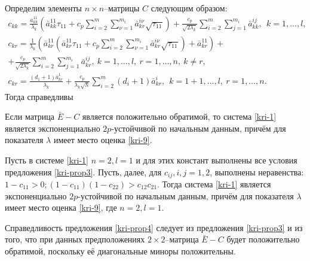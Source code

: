 Определим элементы $n\times n$--матрицы $C$ следующим образом:
$$
\begin{array}{crl}
c_{kk}  = \frac{\bar a^{11}_{kk}}{\lambda _k }\left(\bar
a^{11}_{kk}\tau _{11}  + c_p\sum \limits_{i=2}^m \sum
\limits_{\nu=1}^{m_i}\bar a^{i\nu}_{kr}\sqrt{\tau _{11}}\right) +
\frac{c_p}{\sqrt{2\lambda_k }}\sum
\limits_{i=2}^m \sum \limits_{j=1}^{m_i}\bar a^{ij}_{kk}, \ \ k = 1,\dots,l,\\
c_{kr} = \frac{1}{\lambda _k }\left(\bar a^{11}_{kr}\left(\bar
a^{11}_{kr} \tau _{11} + c_p\sum \limits_{i=2}^m \sum
\limits_{\nu=1}^{m_i}\bar a^{i\nu}_{kr}\sqrt{\tau _{11}}\right)
+ \bar a^{11}_{kr}\right)+
\\ +
\frac{c_p}{\sqrt{2\lambda_k }}\sum
\limits_{i=2}^m \sum \limits_{j=1}^{m_i}\bar a^{ij}_{kr}, \ k =
1,\dots,l,\ r = 1,\dots, n, \ k \neq r,\\
 c_{kr} = \frac{(d_1+1)\bar a^{1}_{kr}}{\lambda_k} +
\frac{c_p}{\lambda_k\sqrt{h}} \sum \limits _{i=2}^{m}\mathrel (d_i +
1)\bar a^{i}_{kr}, \ \ k = 1 + 1,\dots,l,\ r = 1,\dots,n.
\end{array}
$$
Тогда справедливы

\begin{proposition}\label{kri-prop3}
Если матрица $\bar E - C$ является
положительно обратимой, то система \eqref{kri-1} является экспоненциально
${2p}$-устойчивой по начальным данным, причём для показателя
$\lambda$ имеет место оценка \eqref{kri-9}.
\end{proposition}

\begin{proposition}\label{kri-prop4}
Пусть в системе \eqref{kri-1} $n = 2, l = 1$ и для этих констант выполнены все условия предложения \ref{kri-prop3}. Пусть, далее, для $c_{ij}, i,j = 1, 2$, выполнены неравенства: $ 1 - c_{11} > 0; (1 - c_{11})(1 - c_{22}) > c_{12}c_{21}$. Тогда система \eqref{kri-1}
является экспоненциально ${2p}$-устойчивой по начальным данным,
причём для показателя  $\lambda$ имеет место оценка \eqref{kri-9}, где $n = 2,
l = 1$.
\end{proposition}
Справедливость предложения \ref{kri-prop4} следует из предложения \ref{kri-prop3} и из того, что
при данных предположениях $2\times 2$--матрица $\bar E - C$ будет
положительно обратимой, поскольку её диагональные миноры
положительны.

